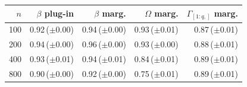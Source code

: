 
\begin{tabular}{rrrrr}
\toprule
$n$ & $\beta$ plug-in & $\beta$ marg. & $\Omega$ marg. & $\Gamma_{[1:q,]}$ marg.\\
\midrule
100 & 0.92\,($\pm$0.00) & 0.94\,($\pm$0.00) & 0.93\,($\pm$0.01) & 0.87\,($\pm$0.01)\\
200 & 0.94\,($\pm$0.00) & 0.96\,($\pm$0.00) & 0.93\,($\pm$0.00) & 0.88\,($\pm$0.01)\\
400 & 0.93\,($\pm$0.01) & 0.94\,($\pm$0.01) & 0.84\,($\pm$0.01) & 0.89\,($\pm$0.01)\\
800 & 0.90\,($\pm$0.00) & 0.92\,($\pm$0.00) & 0.75\,($\pm$0.01) & 0.89\,($\pm$0.01)\\
\bottomrule
\end{tabular}
